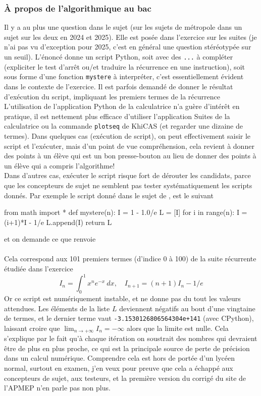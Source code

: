 \documentclass{article}
\begin{document}
\begin{giacjshere}
\subsubsection{\`A propos de l'algorithmique au bac}
Il y a au plus une question dans le sujet (sur les sujets de métropole
dans un sujet sur les deux en 2024 et 2025). Elle est posée 
dans l'exercice sur les suites (je n'ai pas vu d'exception pour 2025, 
c'est en général une question stéréotypée sur un seuil). L'énoncé donne 
un script Python, soit avec des {\tt ...} à compléter (expliciter
le test d'arrêt ou/et traduire la récurrence en une instruction),
soit sous forme d'une fonction {\tt mystere} à interpréter, c'est
essentiellement évident dans le contexte de l'exercice. Il est
parfois demandé de donner le résultat d'exécution du script,
impliquant les premiers termes de la récurrence \\
L'utilisation de l'application Python de la calculatrice
n'a guère d'intérêt en pratique, il est nettement plus efficace d'utiliser
l'application Suites de la calculatrice ou la commande {\tt plotseq}
de KhiCAS (et regarder une dizaine de termes). Dans quelques cas
(exécution de script), on peut effectivement saisir le script
et l'exécuter, mais d'un point de vue compréhension, cela revient
à donner des points à un élève qui est un bon presse-bouton au lieu
de donner des points à un élève qui a compris l'algorithme!\\
Dans d'autres cas, exécuter le script risque fort de dérouter les
candidats, parce que
les concepteurs de sujet ne semblent pas tester systématiquement
les scripts donnés. Par exemple le script donné dans le sujet
de , est le suivant
\begin{giaconload}
from math import *
def mystere(n):
    I = 1 - 1.0/e
    L = [I]
    for i in range(n):
        I = (i+1)*I - 1/e
        L.append(I)
    return L
\end{giaconload}
et on demande ce que renvoie \\
\\
Cela correspond aux 101 premiers termes (d'indice 0 à 100) de la suite
récurrente étudiée dans l'exercice
$$ I_n=\int_0^1 x^n e^{-x} \ dx, \quad I_{n+1}=(n+1)I_n-1/e $$
Or ce script est numériquement instable, et ne donne pas du tout les 
valeurs attendues. Les éléments de la liste $L$ deviennent négatifs au
bout d'une vingtaine de termes, et le dernier terme vaut 
{\tt -3.1530126806564304e+141} (avec CPython), laissant croire
que $\lim_{n \rightarrow +\infty}I_n=-\infty$ alors que la limite est nulle.
Cela s'explique par le fait qu'à chaque itération on soustrait des nombres
qui devraient être de plus en plus proche, ce qui est la principale
source de perte de précision dans un calcul numérique. Comprendre
cela est hors de portée d'un lycéen normal, surtout en examen, j'en
veux pour preuve que cela
a échappé aux concepteurs de sujet, aux testeurs, et la première
version du corrigé du site de l'APMEP n'en parle pas non plus.


\end{giacjshere}
\end{document}
